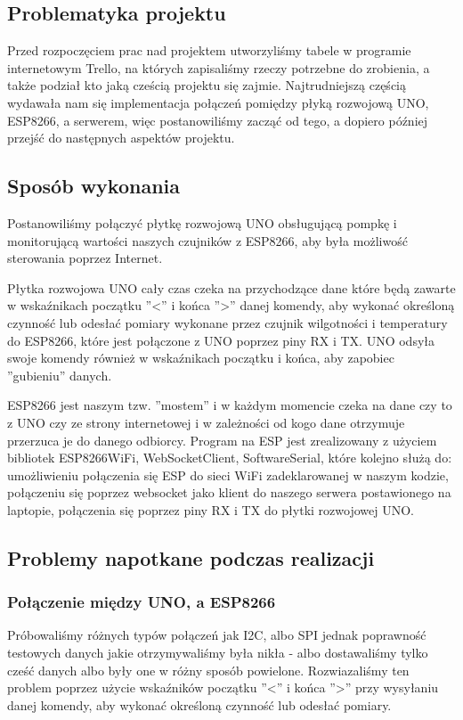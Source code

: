 \documentclass[12pt]{article}
\begin{document}
\subsection{Problematyka projektu}
Przed rozpoczęciem prac nad projektem utworzyliśmy tabele w programie internetowym Trello, na których zapisaliśmy rzeczy potrzebne do zrobienia, a także podział kto jaką cześcią projektu się zajmie. Najtrudniejszą częścią wydawała nam się implementacja połączeń pomiędzy płyką rozwojową UNO, ESP8266, a serwerem, więc postanowiliśmy zacząć od tego, a dopiero później przejść do następnych aspektów projektu. 

\subsection{Sposób wykonania}
Postanowiliśmy połączyć płytkę rozwojową UNO obsługującą pompkę i monitorującą wartości naszych czujników z ESP8266, aby była możliwość sterowania poprzez Internet.

Płytka rozwojowa UNO cały czas czeka na przychodzące dane które będą zawarte w wskaźnikach początku ''<'' i końca ''>'' danej komendy, aby wykonać określoną czynność lub odesłać pomiary wykonane przez czujnik wilgotności i temperatury do ESP8266, które jest połączone z UNO poprzez piny RX i TX. UNO odsyła swoje komendy również w wskaźnikach początku i końca, aby zapobiec ''gubieniu'' danych.

ESP8266 jest naszym tzw. ''mostem'' i w każdym momencie czeka na dane czy to z UNO czy ze strony internetowej i w zależności od kogo dane otrzymuje przerzuca je do danego odbiorcy.
Program na ESP jest zrealizowany z użyciem bibliotek ESP8266WiFi, WebSocketClient, SoftwareSerial, które kolejno służą do: umożliwieniu połączenia się ESP do sieci WiFi zadeklarowanej w naszym kodzie, połączeniu się poprzez websocket jako klient do naszego serwera postawionego na laptopie, połączenia się poprzez piny RX i TX do płytki rozwojowej UNO.

\subsection{Problemy napotkane podczas realizacji}
\subsubsection{Połączenie między UNO, a ESP8266}
Próbowaliśmy różnych typów połączeń jak I2C, albo SPI jednak poprawność testowych danych jakie otrzymywaliśmy była nikła - albo dostawaliśmy tylko cześć danych albo były one w różny sposób powielone.
Rozwiazaliśmy ten problem poprzez użycie wskaźników początku ''<'' i końca ''>'' przy wysyłaniu danej komendy, aby wykonać określoną czynność lub odesłać pomiary. 
\end{document}
